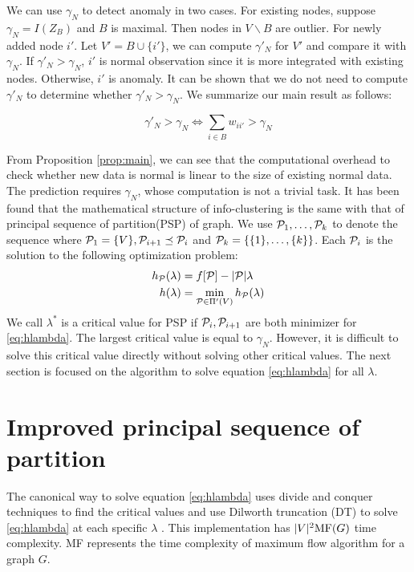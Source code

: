 \documentclass[runningheads]{llncs}
\begin{document}
We can use $\gamma_N$ to detect anomaly in two cases. For existing nodes, suppose $\gamma_N=I(Z_B)$ and $B$ is maximal. Then nodes in $V\backslash B$  are outlier. For newly added node $i'$. Let $V'=B\cup \{i'\}$, we can compute $\gamma'_N$ for $V'$ and compare it with $\gamma_N$. If $\gamma'_N>\gamma_N$, $i'$ is normal observation since it is more integrated with existing nodes. Otherwise, $i'$ is anomaly. It can be shown that we do not need to compute $\gamma'_N$ to determine whether $\gamma'_N>\gamma_N$. We summarize our main result as follows:
\begin{proposition}\label{prop:main}
\begin{equation}
\gamma'_N > \gamma_N \iff  \sum_{i \in B} w_{ii'} > \gamma_N 
\end{equation}
\end{proposition}
From Proposition \ref{prop:main}, we can see that the computational overhead to check whether new data is normal is linear to the size of existing normal data. 
The prediction requires $\gamma_N$, whose computation is not a trivial task. It has been found that the mathematical structure of info-clustering is the same with that of principal sequence of partition(PSP) of graph. We use $\P_1, \dots, \P_k$ to denote the sequence where $\P_1 = \{V\}, \P_{i+1} \preceq \P_i$ and $\P_k = \{\{1\},\dots,\{k\}\}$.
Each $\P_i$ is the solution to the following optimization problem:
\begin{align}
h_{\P}(\lambda) &=  f[\P] - \abs{\P} \lambda  \label{eq:hPL}\\
h(\lambda) &= \min_{\P \in \Pi'(V)} h_{\P}(\lambda) \label{eq:hlambda}
\end{align}
We call $\lambda^*$ is a critical value for PSP if $\P_i, \P_{i+1}$ are both minimizer for \eqref{eq:hlambda}.
The largest critical value is equal to $\gamma_N$. However, it is difficult to solve this critical value directly without solving other critical values. The next section is focused on the algorithm to solve equation \eqref{eq:hlambda} for all $\lambda$.
\section{Improved principal sequence of partition}
The canonical way to solve equation \eqref{eq:hlambda} uses divide and conquer techniques to find the critical values and use Dilworth truncation (DT) to solve \eqref{eq:hlambda} at each specific $\lambda$ \cite{RN7}.  This implementation has $\abs{V}^2 \textrm{MF}(G)$ time complexity. \textrm{MF} represents the time complexity of maximum flow algorithm for a graph $G$. 
\end{document}
